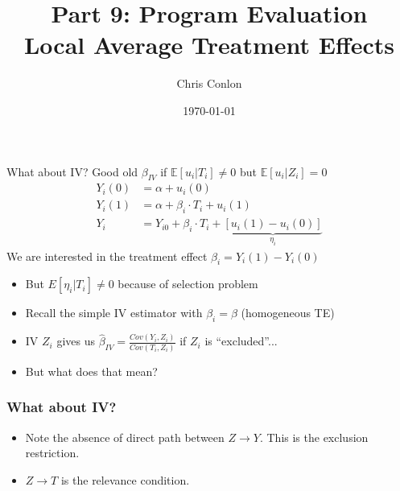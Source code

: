 \documentclass[xcolor=pdftex,dvipsnames,table,mathserif,aspectratio=169]{beamer}
\begin{document}
\title{Part 9: Program Evaluation\\
Local Average Treatment Effects}
\author{Chris Conlon}
\date{\today}

\frame{\titlepage}



\begin{frame}{What about IV?}
Good old $\beta_{IV}$ if $\mathbb{E}[u_i | T_i] \neq 0$ but $\mathbb{E}[u_i | Z_i] = 0$
\begin{align*}
Y_i(0) &= \alpha + u_i(0)\\
Y_i(1) &= \alpha + \beta_i\cdot T_i +  u_i(1)\\
Y_i &= Y_{i0} + \beta_i \cdot T_i  + \underbrace{[u_i(1) - u_i(0)]}_{\eta_i}
\end{align*}
We are interested in the \alert{treatment effect} $\beta_i = Y_i(1) - Y_i(0)$
\begin{itemize}
\item But $E[\eta_i |  T_i] \neq 0$ because of \alert{selection problem}
\item Recall the simple IV estimator with $\beta_i = \beta$ (homogeneous TE)
\item IV $Z_i$ gives us $\widehat{\beta}_{IV}= \frac{Cov(Y_i,Z_i)}{Cov(T_i,Z_i)}$ if $Z_i$ is ``excluded''...
\item But what does that mean?
\end{itemize}
\end{frame}

\begin{frame}
\frametitle{What about IV?}
\begin{itemize}
\item Note the absence of direct path between $Z \rightarrow Y$. This is the \alert{exclusion restriction}.
\item $Z \rightarrow T$ is the \alert{relevance} condition.
\end{itemize}
\vspace{0.5cm}
\begin{center}
\end{center}

\end{frame}
\end{document}
